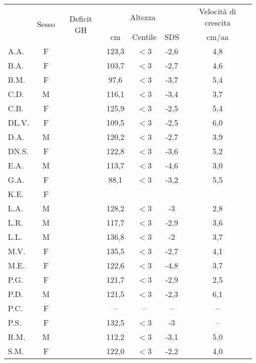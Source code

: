 \begin{table}[!h]
\begin{center}
\begin{tabular}{lcccccc}
\toprule
 & \multirow{2}{*}{Sesso} & \multirow{2}{*}{Deficit GH} & \multicolumn{3}{c}{Altezza} & \multicolumn{1}{c}{Velocità di crescita} \\
 \cmidrule(r){4-6}
 & &   							& cm    & Centile  & SDS & cm/aa	 \\
\midrule
A.A.	& F &  				 		& 123,3 & $<$3  & -2,6 & 4,8 \\
B.A.	& F & \checkmark 	  				& 103,7 & $<$3  & -2,7 & 4,6  \\
B.M.	& F & \checkmark 	  				&  97,6 & $<$3  & -3,7 & 5,4 \\
C.D.	& M & \checkmark 	  				& 116,1 & $<$3  & -3,4 & 3,7 \\
C.B.	& F &  				 	        & 125,9 & $<$3  & -2,5 & 5,4 \\
DL.V.	& F & \checkmark 	  				& 109,5 & $<$3  & -2,5 & 6,0  \\
D.A.	& M &  				  		& 120,2 & $<$3  & -2,7 & 3,9 \\
DN.S.	& F & \checkmark 	  				& 122,8 & $<$3  & -3,6 & 5,2 \\
E.A.	& M &  				  		& 113,7 & $<$3  & -4,6 & 3,0 \\
G.A.	& F &  				  		&  88,1 & $<$3  & -3,2 & 5,5 \\
K.E.	& F &  				  		&       &       &      &     \\
L.A.	& M & \checkmark 	  				& 128,2 & $<$3  & -3   & 2,8 \\
L.R.	& M &  				  		& 117,7 & $<$3  & -2,9 & 3,6 \\
L.L.	& M &  				  		& 136,8 & $<$3  & -2   & 3,7  \\
M.V.	& F & \checkmark 	  				& 135,5 & $<$3  & -2,7 & 4,1 \\
M.E.	& F &  				  		& 122,6 & $<$3  & -4,8 & 3,7 \\
P.G.	& F & \checkmark 	  				& 121,7 & $<$3  & -2,9 & 2,5 \\
P.D.	& M &  				  		& 121,5 & $<$3  & -2,3 & 6,1 \\
P.C.	& F &  				  		& --    & --    & --   & --  \\
P.S.	& F &  				  		& 132,5 & $<$3  & -3   & --  \\
R.M.	& M & \checkmark 	  				& 112,2 & $<$3  & -3,1 & 5,0 \\
S.M.	& F & \checkmark 	  				& 122,0 & $<$3  & -2,2 & 4,0 \\

\end{tabular}
\end{center}
\end{table}
